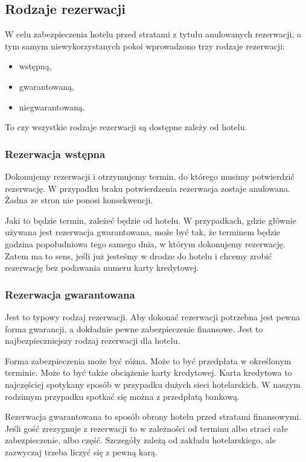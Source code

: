 \documentclass[a4paper,onecolumn,oneside,11pt,wide,floatssmall]{mwrep}
\theoremstyle{definition}
\theoremstyle{plain}%
\theoremstyle{remark}
\begin{document}
\subsection{Rodzaje rezerwacji}
W celu zabezpieczenia hotelu przed stratami z tytułu anulowanych rezerwacji, 
a tym samym niewykorzystanych pokoi wprowadzono trzy rodzaje rezerwacji:

\begin{itemize}
  \item wstępną,
  \item gwarantowaną,
  \item niegwarantowaną.
\end{itemize}

To czy wszystkie rodzaje rezerwacji są dostępne zależy od hotelu. 

\subsubsection{Rezerwacja wstępna}
Dokonujemy rezerwacji i otrzymujemy termin, do którego musimy potwierdzić 
rezerwację. W przypadku braku potwierdzenia rezerwacja zostaje anulowana. 
Żadna ze stron nie ponosi konsekwencji.

Jaki to będzie termin, zależeć będzie od hotelu. W przypadkach, gdzie 
głównie używana jest rezerwacja gwarantowana, może być tak, że terminem 
będzie godzina popołudniowa tego samego dnia, w którym dokonujemy rezerwację.
 Zatem ma to sens, jeśli już jesteśmy w drodze do hotelu i chcemy zrobić 
 rezerwację bez podawania numeru karty kredytowej.

\subsubsection{Rezerwacja gwarantowana}
Jest to typowy rodzaj rezerwacji. Aby dokonać rezerwacji potrzebna jest 
pewna forma gwarancji, a dokładnie pewne zabezpieczenie finansowe. Jest to 
najbezpieczniejszy rodzaj rezerwacji dla hotelu.

Forma zabezpieczenia może być różna. Może to być przedpłata w określonym 
terminie. Może to być także obciążenie karty kredytowej. Karta kredytowa to 
najczęściej spotykany sposób w przypadku dużych sieci hotelarskich. W naszym 
rodzimym przypadku spotkać się można z przedpłatą bankową.

Rezerwacja gwarantowana to sposób obrony hotelu przed stratami finansowymi. 
Jeśli gość zrezygnuje z rezerwacji to w zależności od terminu albo straci 
całe zabezpieczenie, albo część. Szczegóły zależą od zakładu hotelarskiego, 
ale zazwyczaj trzeba liczyć się z pewną karą.
\end{document}
